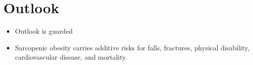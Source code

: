 \section{Outlook}
\begin{itemize}[noitemsep]
  \item Outlook is guarded
  \item Sarcopenic obesity carries additive risks for falls, fractures, physical disability, cardiovascular disease, and mortality.
\end{itemize}
